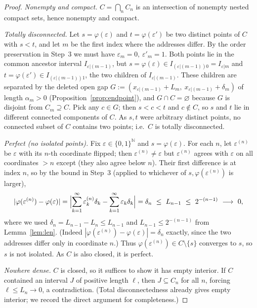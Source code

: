 \documentclass{amsart}
\theoremstyle{definition}
\theoremstyle{remark}
\begin{document}
\begin{proof}
\emph{Nonempty and compact.} $C=\bigcap_n C_n$ is an intersection of nonempty
nested compact sets, hence nonempty and compact.

\smallskip
\emph{Totally disconnected.} Let $s=\varphi(\varepsilon)$ and
$t=\varphi(\varepsilon')$ be two distinct points of $C$ with $s<t$, and let $m$ be
the first index where the addresses differ. By the order preservation in Step~3 we
must have $\varepsilon_m=0,\ \varepsilon'_m=1$. Both points lie in the common
ancestor interval $I_{\varepsilon|(m-1)}$, but
$s=\varphi(\varepsilon)\in I_{(\varepsilon|(m-1))0}=I_{\varepsilon|m}$ and
$t=\varphi(\varepsilon')\in I_{(\varepsilon|(m-1))1}$, the two children of
$I_{\varepsilon|(m-1)}$. These children are separated by the deleted open gap
$G:=(x_{\varepsilon|(m-1)}+L_m,\ x_{\varepsilon|(m-1)}+\delta_m)$ of length
$\alpha_m>0$ (Proposition~\ref{prop:endpoint}), and $G\cap C=\varnothing$ because
$G$ is disjoint from $C_m\supseteq C$. Pick any $c\in G$; then $s<c<t$ and
$c\notin C$, so $s$ and $t$ lie in different connected components of $C$. As $s,t$
were arbitrary distinct points, no connected subset of $C$ contains two points;
i.e.\ $C$ is totally disconnected.

\smallskip
\emph{Perfect (no isolated points).} Fix $\varepsilon\in\{0,1\}^{\mathbb N}$ and
$s=\varphi(\varepsilon)$. For each $n$, let $\varepsilon^{(n)}$ be $\varepsilon$
with its $n$-th coordinate flipped; then $\varepsilon^{(n)}\ne\varepsilon$ but
$\varepsilon^{(n)}$ agrees with $\varepsilon$ on all coordinates $>n$ except (they
also agree below $n$). Their first difference is at index $n$, so by the bound in
Step~3 (applied to whichever of $s,\varphi(\varepsilon^{(n)})$ is larger),
\[
|\varphi(\varepsilon^{(n)})-\varphi(\varepsilon)|
=\Bigl|\sum_{k=1}^{\infty}\varepsilon^{(n)}_k\delta_k-\sum_{k=1}^{\infty}\varepsilon_k\delta_k\Bigr|
=\delta_n\ \le\ L_{n-1}\ \le\ 2^{-(n-1)}\ \longrightarrow\ 0,
\]
where we used $\delta_n=L_{n-1}-L_n\le L_{n-1}$ and $L_{n-1}\le 2^{-(n-1)}$ from
Lemma~\ref{lem:len}. (Indeed $|\varphi(\varepsilon^{(n)})-\varphi(\varepsilon)|
=\delta_n$ exactly, since the two addresses differ only in coordinate $n$.) Thus
$\varphi(\varepsilon^{(n)})\in C\setminus\{s\}$ converges to $s$, so $s$ is not
isolated. As $C$ is also closed, it is perfect.

\smallskip
\emph{Nowhere dense.} $C$ is closed, so it suffices to show it has empty interior.
If $C$ contained an interval $J$ of positive length $\ell$, then $J\subseteq C_n$
for all $n$, forcing $\ell\le L_n\to0$, a contradiction. (Total disconnectedness
already gives empty interior; we record the direct argument for completeness.)
\end{proof}
\end{document}
